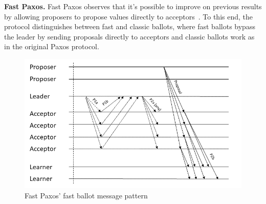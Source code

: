 \textbf{Fast Paxos.} Fast Paxos observes that it's possible to improve on previous results by allowing proposers to propose values directly to acceptors~\cite{Lamport2006}. To this end, the protocol distinguishes between fast and classic ballots, where fast ballots bypass the leader by sending proposals directly to acceptors and classic ballots work as in the original Paxos protocol. 
\begin{figure}
	\centering
	\includegraphics[width=\textwidth*2/3]{Figures/fast_paxos}
	\caption{Fast Paxos' fast ballot message pattern}
	\label{fast_paxos_fig}
\end{figure}

